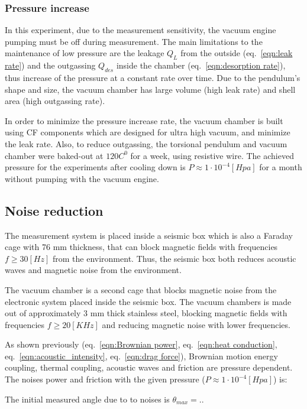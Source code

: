 \documentclass[\main/master.tex]{subfiles}
\begin{document}
\subsubsection{Pressure increase}
\par\noindent
In this experiment, due to the measurement sensitivity, the vacuum engine pumping must be off during measurement. The main limitations to the maintenance of low pressure are the leakage $Q_L$ from the outside (eq.~\ref{eqn:leak rate}) and the outgassing $Q_{des}$ inside the chamber (eq.~\ref{eqn:desorption rate}), thus increase of the pressure at a constant rate over time. Due to the pendulum's shape and size, the vacuum chamber has large volume (high leak rate) and shell area (high outgassing rate).
\par\noindent
In order to minimize the pressure increase rate, the vacuum chamber is built using CF components which are designed for ultra high vacuum, and minimize the leak rate. Also, to reduce outgassing, the torsional pendulum and vacuum chamber were baked-out at $120 C^0$ for a week, using resistive wire. The achieved pressure for the experiments after cooling down is $P \approx 1\cdot 10^{−4} [Hpa]$ for a month without pumping with the vacuum engine.

\subsection{Noise reduction}
The measurement system is placed inside a seismic box which is also a Faraday cage with 76 mm thickness, that can block magnetic fields with frequencies $f \ge 30 [Hz]$ from the environment. Thus, the seismic box both reduces acoustic waves and magnetic noise from the environment.
\par\noindent
The vacuum chamber is a second cage that blocks magnetic noise from the electronic system placed inside the seismic box. The vacuum chambers is made out of approximately 3 mm thick stainless steel, blocking magnetic fields with frequencies $f\ge 20 [KHz]$ and reducing magnetic noise with lower frequencies.
\par\noindent
As shown previously (eq.~\ref{eqn:Brownian power}, eq.~\ref{eqn:heat conduction}, eq.~\ref{eqn:acoustic_intensity}, eq.~\ref{eqn:drag force}), Brownian motion energy coupling, thermal coupling, acoustic waves and friction are pressure dependent. The  noises power and friction with the given pressure ($P \approx 1\cdot 10^{−4} [Hpa]$) is:


The initial measured angle due to to noises is $\theta_{max} =.. $
\end{document}
